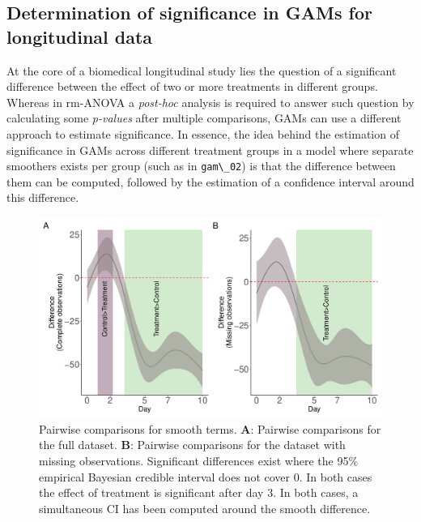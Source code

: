 \documentclass[
]{article}
\newcommand{\passthrough}[1]{#1}
\begin{document}
\hypertarget{GAM-significance}{%
\subsection{Determination of significance in GAMs for longitudinal data}\label{GAM-significance}}

At the core of a biomedical longitudinal study lies the question of a significant difference between the effect of two or more treatments in different groups. Whereas in rm-ANOVA a \emph{post-hoc} analysis is required to answer such question by calculating some \emph{p-values} after multiple comparisons, GAMs can use a different approach to estimate significance. In essence, the idea behind the estimation of significance in GAMs across different treatment groups in a model where separate smoothers exists per group (such as in \passthrough{\lstinline!gam\_02!}) is that the difference between them can be computed, followed by the estimation of a confidence interval around this difference.



\begin{figure}

{\centering \includegraphics[width=1\linewidth]{Full_document_SIM_No_Appendix_files/figure-latex/plot-pairwise-comp-1} 

}

\caption{Pairwise comparisons for smooth terms. \textbf{A}: Pairwise comparisons for the full dataset. \textbf{B}: Pairwise comparisons for the dataset with missing observations. Significant differences exist where the 95\% empirical Bayesian credible interval does not cover 0. In both cases the effect of treatment is significant after day 3. In both cases, a simultaneous CI has been computed around the smooth difference.}\label{fig:plot-pairwise-comp}
\end{figure}
\end{document}
